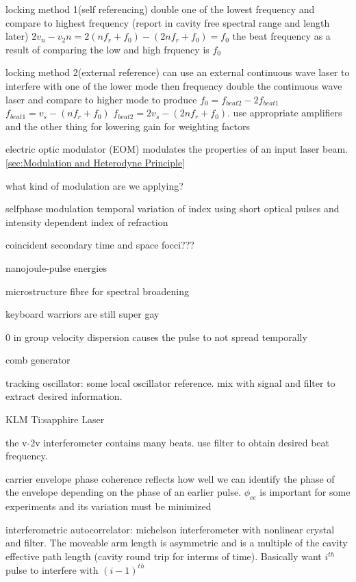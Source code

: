 \documentclass[11pt,a4paper]{book}
\begin{document}
locking method 1(self referencing)
double one of the lowest frequency and compare to highest frequency (report in cavity free spectral range and length later)
$2v_n - v_2n = 2 ( n f_r + f_0)-( 2nf_r + f_0) = f_0$
the beat frequency as a result of comparing the low and high frquency is $f_0$

locking method 2(external reference)
can use an external continuous wave laser to interfere with one of the lower mode then frequency double the continuous wave laser and compare to higher mode to produce $f_0 = f_{beat2} - 2 f_{beat1}$ $f_{beat1}=v_s - (nf_r +f_0)$ $f_{beat2} = 2v_s - (2nf_r +f_0)$. use appropriate amplifiers and the other thing for lowering gain for weighting factors

electric optic modulator (EOM) modulates the properties of an input laser beam. \autoref{sec:Modulation and Heterodyne Principle}

what kind of modulation are we applying?

selfphase modulation temporal variation of index using short optical pulses and intensity dependent index of refraction

coincident secondary time and space focci???

nanojoule-pulse energies

microstructure fibre for spectral broadening

keyboard warriors are still super gay

0 in group velocity dispersion causes the pulse to not spread temporally

comb generator

tracking oscillator: some local oscillator reference. mix with signal and filter to extract desired information.

KLM Ti:sapphire Laser

the v-2v interferometer contains many beats. use filter to obtain desired beat frequency.

carrier envelope phase coherence reflects how well we can identify the phase of the envelope depending on the phase of an earlier pulse. $\phi_{ce}$ is important for some experiments and its variation must be minimized 

interferometric autocorrelator: michelson interferometer with nonlinear crystal and filter. The moveable arm length is asymmetric and is a multiple of the cavity effective path length (cavity round trip for interms of time). Basically want $i^{th}$ pulse to interfere with $(i-1)^{th}$ 
\end{document}
